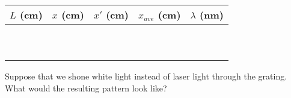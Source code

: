 \begin{center}
\begin{tabular}{|c|c|c|c|c|}
\hline 
\( L \) (cm)&
\( x \) (cm)&
\( x' \) (cm)&
\( x_{ave} \) (cm)&
\( \lambda  \) (nm)\\
\hline
\hline 
&
&
&
&
\\
&
&
&
&
\\
\hline 
&
&
&
&
\\
&
&
&
&
\\
\hline 
&
&
&
&
\\
&
&
&
&
\\
\hline 
&
&
&
&
\\
&
&
&
&
\\
\hline 
&
&
&
&
\\
&
&
&
&
\\
\hline
\end{tabular}\vspace{0.3cm}

\end{center}


Suppose that we shone white light instead of laser light
through the grating.  What would the resulting pattern look
like?
